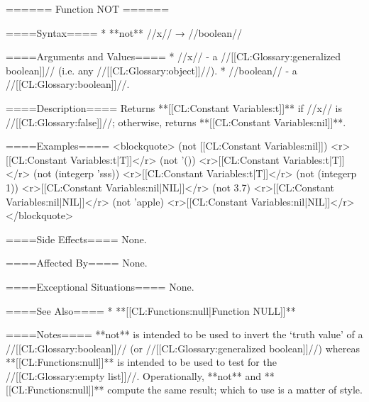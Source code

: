 ====== Function NOT ======

====Syntax====
  * **not** //x// → //boolean//

====Arguments and Values====
  * //x// - a //[[CL:Glossary:generalized boolean]]// (i.e. any //[[CL:Glossary:object]]//).
  * //boolean// - a //[[CL:Glossary:boolean]]//.

====Description====
Returns **[[CL:Constant Variables:t]]** if //x// is //[[CL:Glossary:false]]//; otherwise, returns **[[CL:Constant Variables:nil]]**.

====Examples====
<blockquote> 
(not [[CL:Constant Variables:nil]]) <r>[[CL:Constant Variables:t|T]]</r>
(not '()) <r>[[CL:Constant Variables:t|T]]</r>
(not (integerp 'sss)) <r>[[CL:Constant Variables:t|T]]</r>
(not (integerp 1)) <r>[[CL:Constant Variables:nil|NIL]]</r>
(not 3.7) <r>[[CL:Constant Variables:nil|NIL]]</r>
(not 'apple) <r>[[CL:Constant Variables:nil|NIL]]</r>
</blockquote>

====Side Effects====
None.

====Affected By====
None.

====Exceptional Situations====
None.

====See Also====
  * **[[CL:Functions:null|Function NULL]]**

====Notes====
**not** is intended to be used to invert the `truth value' of a //[[CL:Glossary:boolean]]// (or //[[CL:Glossary:generalized boolean]]//) whereas **[[CL:Functions:null]]** is intended to be used to test for the //[[CL:Glossary:empty list]]//. Operationally, **not** and **[[CL:Functions:null]]** compute the same result; which to use is a matter of style.

